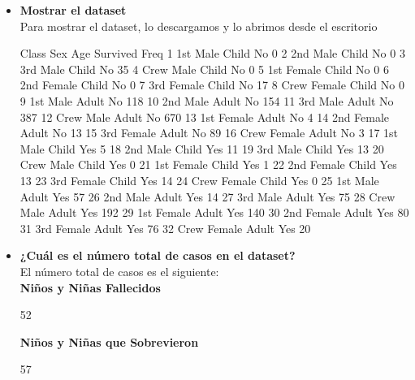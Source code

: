 \documentclass[a4paper,openright,12pt]{report}
\begin{document}
{\begin{itemize}
\item \textbf{Mostrar el dataset}\\
Para mostrar el dataset, lo descargamos y lo abrimos desde el escritorio
\begin{Schunk}
\begin{Soutput}
   Class    Sex   Age Survived Freq
1    1st   Male Child       No    0
2    2nd   Male Child       No    0
3    3rd   Male Child       No   35
4   Crew   Male Child       No    0
5    1st Female Child       No    0
6    2nd Female Child       No    0
7    3rd Female Child       No   17
8   Crew Female Child       No    0
9    1st   Male Adult       No  118
10   2nd   Male Adult       No  154
11   3rd   Male Adult       No  387
12  Crew   Male Adult       No  670
13   1st Female Adult       No    4
14   2nd Female Adult       No   13
15   3rd Female Adult       No   89
16  Crew Female Adult       No    3
17   1st   Male Child      Yes    5
18   2nd   Male Child      Yes   11
19   3rd   Male Child      Yes   13
20  Crew   Male Child      Yes    0
21   1st Female Child      Yes    1
22   2nd Female Child      Yes   13
23   3rd Female Child      Yes   14
24  Crew Female Child      Yes    0
25   1st   Male Adult      Yes   57
26   2nd   Male Adult      Yes   14
27   3rd   Male Adult      Yes   75
28  Crew   Male Adult      Yes  192
29   1st Female Adult      Yes  140
30   2nd Female Adult      Yes   80
31   3rd Female Adult      Yes   76
32  Crew Female Adult      Yes   20
\end{Soutput}
\end{Schunk}


\item \textbf{¿Cuál es el número total de casos en el dataset?}\\
El número total de casos es el siguiente:\\
\textbf{Niños y Niñas Fallecidos}\\

\begin{Schunk}
\begin{Soutput}
[1] 52
\end{Soutput}
\end{Schunk}

\textbf{Niños y Niñas que Sobrevieron}\\

\begin{Schunk}
\begin{Soutput}
[1] 57
\end{Soutput}
\end{Schunk}


\end{itemize}}
\end{document}
